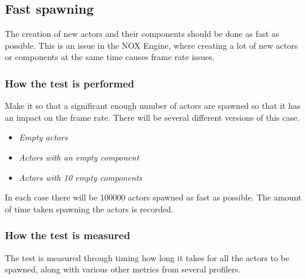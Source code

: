 \subsection{Fast spawning}
The creation of new actors and their components should be done as fast as possible.
This is an issue in the NOX Engine, where creating a lot of new actors or components at the same time causes frame rate issues.

\subsubsection*{How the test is performed}
Make it so that a significant enough number of actors are spawned so that it has an impact on the frame rate.
There will be several different versions of this case.

\begin{itemize}

    \item\noindent\textit{Empty actors}\\

    \item\noindent\textit{Actors with an empty component}\\

    \item\noindent\textit{Actors with 10 empty components}\\

\end{itemize}
In each case there will be 100000 actors spawned as fast as possible.
The amount of time taken spawning the actors is recorded.


\subsubsection*{How the test is measured}
The test is measured through timing how long it takes for all the actors to be spawned, along with various other metrics from several profilers.
